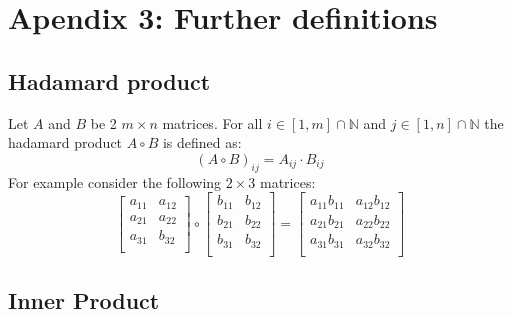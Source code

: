 \documentclass[12pt]{article}
\begin{document}
\section{Apendix 3: Further definitions}
\subsection{Hadamard product}\label{sec:hadamerd_product}
Let \(A\) and \(B\) be 2 \(m \times n\) matrices. For all \(i \in [1, m]\cap\mathbb N\) and \(j \in [1, n]\cap\mathbb N\)
the hadamard product \(A \circ B\) is defined as:
\begin{equation} \label{eq:defs:Hadamard product}
\left(A \circ B\right)_{ij} = A_{ij} \cdot B_{ij}
\end{equation}
For example consider the following \(2 \times 3\) matrices:
\[
\left[
\begin{array}{ll}
a_{11} & a_{12} \\
a_{21} & a_{22} \\
a_{31} & b_{32} \\
\end{array}
\right] \circ 
\left[
\begin{array}{ll}
b_{11} & b_{12} \\
b_{21} & b_{22} \\
b_{31} & b_{32} \\
\end{array}
\right] = 
\left[
\begin{array}{ll}
a_{11}b_{11} & a_{12}b_{12} \\
a_{21}b_{21} & a_{22}b_{22} \\
a_{31}b_{31} & a_{32}b_{32} \\
\end{array}
\right]
\]

\subsection{Inner Product}
\end{document}
